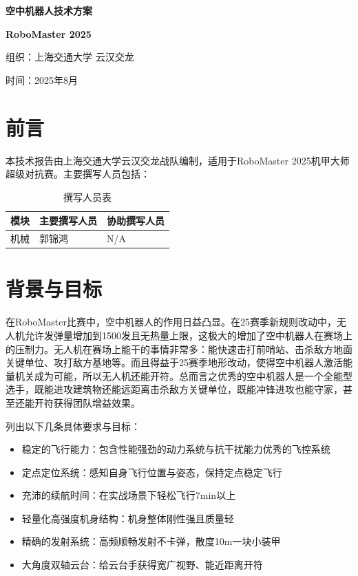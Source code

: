 \documentclass[12pt,a4paper]{ctexart}
\begin{document}
\begin{titlepage}
    \centering
    {\Huge\bfseries 空中机器人技术方案\par}
    \vspace{1cm}
    {\large\bfseries RoboMaster 2025\par}
    \vspace{1cm}
    {\large 组织：上海交通大学 云汉交龙\par}
    \vspace{0.5cm}
    {\large 时间：2025年8月\par}
\end{titlepage}

\tableofcontents
\newpage

\section{前言}
本技术报告由上海交通大学云汉交龙战队编制，适用于RoboMaster 2025机甲大师超级对抗赛。主要撰写人员包括：

\begin{table}[h]
    \centering
    \begin{tabular}{lll}
        \toprule
        模块 & 主要撰写人员 & 协助撰写人员 \\
        \midrule
        机械 & 郭锦鸿 & N/A \\
        \bottomrule
    \end{tabular}
    \caption{撰写人员表}
\end{table}

\section{背景与目标}
在RoboMaster比赛中，空中机器人的作用日益凸显。在25赛季新规则改动中，无人机允许发弹量增加到1500发且无热量上限，这极大的增加了空中机器人在赛场上的压制力。无人机在赛场上能干的事情非常多：能快速击打前哨站、击杀敌方地面关键单位、攻打敌方基地等。而且得益于25赛季地形改动，使得空中机器人激活能量机关成为可能，所以无人机还能开符。总而言之优秀的空中机器人是一个全能型选手，既能进攻建筑物还能远距离击杀敌方关键单位，既能冲锋进攻也能守家，甚至还能开符获得团队增益效果。

列出以下几条具体要求与目标：
\begin{itemize}
    \item 稳定的飞行能力：包含性能强劲的动力系统与抗干扰能力优秀的飞控系统
    \item 定点定位系统：感知自身飞行位置与姿态，保持定点稳定飞行
    \item 充沛的续航时间：在实战场景下轻松飞行7min以上
    \item 轻量化高强度机身结构：机身整体刚性强且质量轻
    \item 精确的发射系统：高频顺畅发射不卡弹，散度10m一块小装甲
    \item 大角度双轴云台：给云台手获得宽广视野、能近距离开符
\end{itemize}
\end{document}
